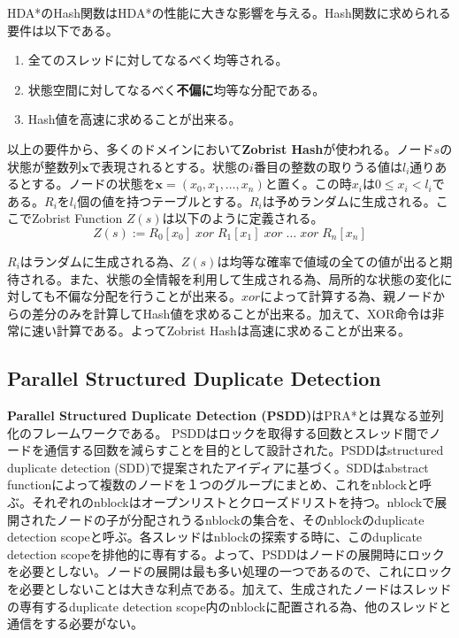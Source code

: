 \documentclass[uplatex]{jsarticle}
\begin{document}
\vspace{3mm}

HDA*のHash関数はHDA*の性能に大きな影響を与える。Hash関数に求められる要件は以下である。

\begin{enumerate}
	\item 全てのスレッドに対してなるべく均等される。
	\item 状態空間に対してなるべく\textbf{不偏に}均等な分配である。
	\item Hash値を高速に求めることが出来る。
\end{enumerate}

以上の要件から、多くのドメインにおいて\textbf{Zobrist Hash}が使われる\cite{Zobrist1970}。ノード$s$の状態が整数列$\mathbf{x}$で表現されるとする。状態の$i$番目の整数の取りうる値は$l_{i}$通りあるとする。ノードの状態を$\mathbf{x} = (x_{0}, x_{1}, …, x_{n})$と置く。この時$x_{i}$は$0 \leq x_{i} < l_{i}$である。$R_{i}$を$l_{i}$個の値を持つテーブルとする。$R_{i}$は予めランダムに生成される。ここでZobrist Function $Z(s)$は以下のように定義される。
\newline
\begin{equation}
	Z(s) := R_{0}[x_{0}]\; xor\; R_{1}[x_{1}]\; xor\; …\; xor\; R_{n}[x_{n}]%
\end{equation}

$R_{i}$はランダムに生成される為、$Z(s)$は均等な確率で値域の全ての値が出ると期待される。また、状態の全情報を利用して生成される為、局所的な状態の変化に対しても不偏な分配を行うことが出来る。$xor$によって計算する為、親ノードからの差分のみを計算してHash値を求めることが出来る。加えて、XOR命令は非常に速い計算である。よってZobrist Hashは高速に求めることが出来る。


\subsection{Parallel Structured Duplicate Detection}
\textbf{Parallel Structured Duplicate Detection (PSDD)}はPRA*とは異なる並列化のフレームワークである\cite{zhou2007parallel}。
PSDDはロックを取得する回数とスレッド間でノードを通信する回数を減らすことを目的として設計された。PSDDはstructured duplicate detection (SDD)で提案されたアイディアに基づく\cite{zhou2004structured}。SDDはabstract functionによって複数のノードを１つのグループにまとめ、これをnblockと呼ぶ。それぞれのnblockはオープンリストとクローズドリストを持つ。nblockで展開されたノードの子が分配されうるnblockの集合を、そのnblockのduplicate detection scopeと呼ぶ。各スレッドはnblockの探索する時に、このduplicate detection scopeを排他的に専有する。よって、PSDDはノードの展開時にロックを必要としない。ノードの展開は最も多い処理の一つであるので、これにロックを必要としないことは大きな利点である。加えて、生成されたノードはスレッドの専有するduplicate detection scope内のnblockに配置される為、他のスレッドと通信をする必要がない。
\end{document}
